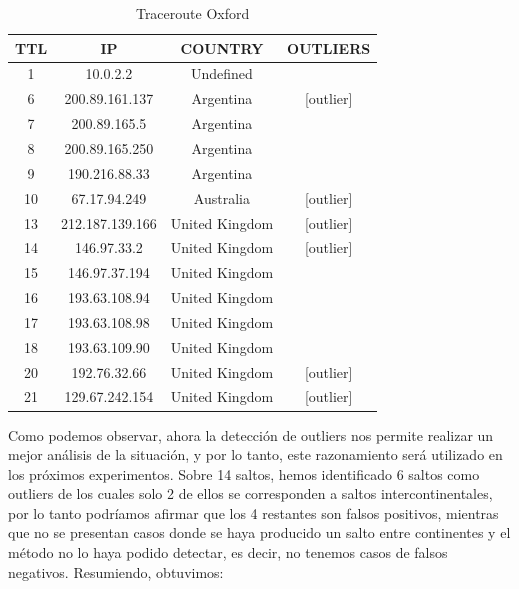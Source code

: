 \begin{table}[!htbp]
\centering
\caption{Traceroute Oxford}
\label{traceroute-oxford}
\begin{tabular}{|c|c|c|c|}
\hline
\textbf{TTL} & \textbf{IP}       & \textbf{COUNTRY} & \textbf{OUTLIERS} \\ \hline
1            & 10.0.2.2          & Undefined        & 			       \\ \hline
6            & 200.89.161.137    & Argentina        & {[}outlier{]}     \\ \hline
7            & 200.89.165.5      & Argentina        &                   \\ \hline
8            & 200.89.165.250    & Argentina        &                   \\ \hline
9            & 190.216.88.33     & Argentina        &                   \\ \hline
10           & 67.17.94.249      & Australia        & {[}outlier{]}     \\ \hline
13           & 212.187.139.166   & United Kingdom   & {[}outlier{]}     \\ \hline
14           & 146.97.33.2       & United Kingdom   & {[}outlier{]}     \\ \hline
15           & 146.97.37.194     & United Kingdom   &                   \\ \hline
16           & 193.63.108.94     & United Kingdom   &                   \\ \hline
17           & 193.63.108.98     & United Kingdom   &                   \\ \hline
18           & 193.63.109.90     & United Kingdom   &                   \\ \hline
20           & 192.76.32.66      & United Kingdom   & {[}outlier{]}     \\ \hline
21           & 129.67.242.154    & United Kingdom   & {[}outlier{]}     \\ \hline
\end{tabular}
\end{table}


Como podemos observar, ahora la detección de outliers nos permite realizar un mejor análisis de la situación, y por lo tanto, este razonamiento será utilizado en los próximos experimentos. Sobre 14 saltos, hemos identificado 6 saltos como outliers de los cuales solo 2 de ellos se corresponden a saltos intercontinentales, por lo tanto podríamos afirmar que los 4 restantes son falsos positivos, mientras que no se presentan casos donde se haya producido un salto entre continentes y el método no lo haya podido detectar, es decir, no tenemos casos de falsos negativos. Resumiendo, obtuvimos:

